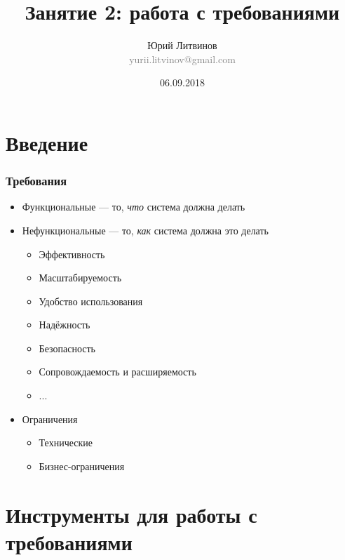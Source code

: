 \documentclass[xetex,mathserif,serif]{beamer}
\title{Занятие 2: работа с требованиями}
\author[Юрий Литвинов]{Юрий Литвинов\\\small{\textcolor{gray}{yurii.litvinov@gmail.com}}}
\date{06.09.2018}
\begin{document}
	\frame{\titlepage}

	\section{Введение}

	\begin{frame}
		\frametitle{Требования}
		\begin{itemize}
			\item Функциональные --- то, \emph{что} система должна делать
			\item Нефункциональные --- то, \emph{как} система должна это делать
			\begin{itemize}
				\item Эффективность
				\item Масштабируемость
				\item Удобство использования
				\item Надёжность
				\item Безопасность
				\item Сопровождаемость и расширяемость
				\item ...
			\end{itemize}
			\item Ограничения
			\begin{itemize}
				\item Технические
				\item Бизнес-ограничения
			\end{itemize}
		\end{itemize}
	\end{frame}

	\section{Инструменты для работы с требованиями}
\end{document}
